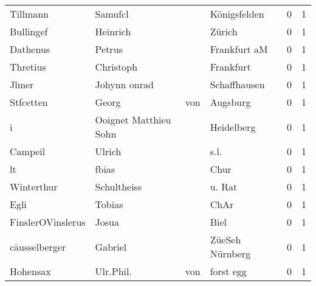 \begin{tabular}{llllrr}
                 Tillmann &                            Samufcl &             &                                Königsfelden &          0 &         1 \\
                Bullingef &                           Heinrich &             &                                      Zürich &          0 &         1 \\
                 Dathenus &                             Petrus &             &                                Frankfurt aM &          0 &         1 \\
                 Thretius &                          Christoph &             &                                   Frankfurt &          0 &         1 \\
                    Jlmer &                       Johynn onrad &             &                                Schaffhausen &          0 &         1 \\
                Stfcetten &                              Georg &         von &                                    Augsburg &          0 &         1 \\
                        i &              Ooignet Matthieu Sohn &             &                                  Heidelberg &          0 &         1 \\
                  Campeil &                             Ulrich &             &                                        s.l. &          0 &         1 \\
                       lt &                              fbias &             &                                        Chur &          0 &         1 \\
               Winterthur &                        Schultheiss &             &                                      u. Rat &          0 &         1 \\
                     Egli &                             Tobias &             &                                        ChAr &          0 &         1 \\
        FinslerOVinslerus &                              Josua &             &                                        Biel &          0 &         1 \\
            cäusselberger &                            Gabriel &             &                             ZüeSeh Nürnberg &          0 &         1 \\
                 Hohensax &                          Ulr.Phil. &         von &                                   forst egg &          0 &         1 \\

\end{tabular}
